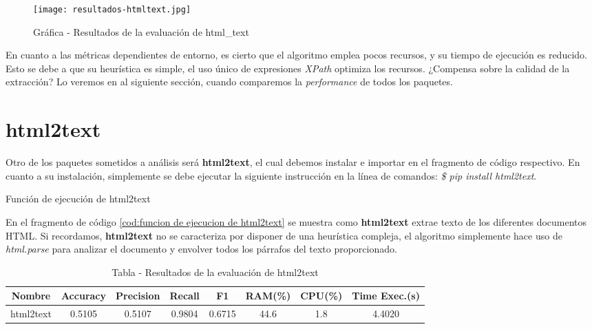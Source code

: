 \begin{figure}[tphb]
    \centering
    \texttt{[image: resultados-htmltext.jpg]}
    \caption{Gráfica - Resultados de la evaluación de html\_text}
    \label{img:grafica - resultados de la evaluacion de htmltext}
\end{figure}

En cuanto a las métricas dependientes de entorno, es cierto que el algoritmo emplea pocos recursos, y su
tiempo de ejecución es reducido. Esto se debe a que su heurística es simple, el uso único de expresiones
\emph{XPath} optimiza los recursos. ¿Compensa sobre la calidad de la extracción? Lo veremos en al siguiente
sección, cuando comparemos la \emph{performance} de todos los paquetes.

\section*{html2text}

Otro de los paquetes sometidos a análisis será \textbf{html2text}, el cual debemos instalar e importar en 
el fragmento de código respectivo. En cuanto a su instalación, simplemente se debe ejecutar la siguiente 
instrucción en la línea de comandos: \emph{\$ pip install html2text}.

\begin{codefloat}
    
    \caption{Función de ejecución de html2text}
    \label{cod:funcion de ejecucion de html2text}
\end{codefloat}

En el fragmento de código \ref{cod:funcion de ejecucion de html2text} se muestra como \textbf{html2text}
extrae texto de los diferentes documentos HTML. Si recordamos, \textbf{html2text} no se caracteriza por
disponer de una heurística compleja, el algoritmo simplemente hace uso de \emph{html.parse} para analizar
el documento y envolver todos los párrafos del texto proporcionado.

\begin{table}[h]
    \begin{center}
      \begin{tabular}{| c | c | c | c | c | c | c | c |} \hline 
       \textbf{Nombre} & \textbf{Accuracy} & \textbf{Precision}  & \textbf{Recall} & \textbf{F1} & \textbf{RAM(\%)} & \textbf{CPU(\%)} & \textbf{Time Exec.(s)} \\ \hline
       html2text & 0.5105 & 0.5107 & 0.9804 & 0.6715 & 44.6 & 1.8 & 4.4020 \\ \hline
      \end{tabular}
      \caption{Tabla - Resultados de la evaluación de html2text}
      \label{tab:tabla - resultados de la evaluacion de html2text}
    \end{center}
\end{table}

